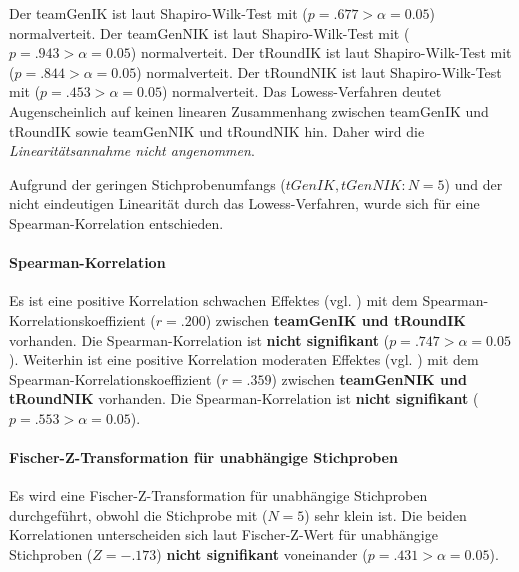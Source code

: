 \documentclass[a4paper,11pt]{article}%
\renewcommand{\\}{\vspace*{0.5\baselineskip} \newline}
\begin{document}
%
Der \ac{teamGenIK} ist laut Shapiro-Wilk-Test mit ($p = .677 > \alpha = 0.05$) normalverteit. \newline
Der \ac{teamGenNIK} ist laut Shapiro-Wilk-Test mit ($p = .943 > \alpha = 0.05$) normalverteit. \newline
Der \ac{tRoundIK} ist laut Shapiro-Wilk-Test mit ($p = .844 > \alpha = 0.05$) normalverteit. \newline
Der \ac{tRoundNIK} ist laut Shapiro-Wilk-Test mit ($p = .453 > \alpha = 0.05$) normalverteit. \\
Das Lowess-Verfahren deutet Augenscheinlich auf keinen linearen Zusammenhang zwischen \ac{teamGenIK} und \ac{tRoundIK} sowie \ac{teamGenNIK} und \ac{tRoundNIK} hin. Daher wird die \textit{Linearitätsannahme nicht angenommen}.

Aufgrund der geringen Stichprobenumfangs ($tGenIK, tGenNIK : N=5$) und der nicht eindeutigen Linearität durch das Lowess-Verfahren, wurde sich für eine Spearman-Korrelation entschieden.

\paragraph{Spearman-Korrelation}
Es ist eine positive Korrelation schwachen Effektes (vgl. \cite{cohen2013statistical}) mit dem Spearman-Korrelationskoeffizient ($r = .200$) zwischen \textbf{\ac{teamGenIK} und \ac{tRoundIK}} vorhanden. Die Spearman-Korrelation ist \textbf{nicht signifikant} ($p = .747 > \alpha = 0.05$).\\
Weiterhin ist eine positive Korrelation moderaten Effektes (vgl. \cite{cohen2013statistical}) mit dem Spearman-Korrelationskoeffizient ($r = .359$) zwischen \textbf{\ac{teamGenNIK} und \ac{tRoundNIK}} vorhanden. Die Spearman-Korrelation ist \textbf{nicht signifikant} ($p = .553 > \alpha = 0.05$).

\paragraph{Fischer-Z-Transformation für unabhängige Stichproben}
Es wird eine Fischer-Z-Transformation für unabhängige Stichproben durchgeführt, obwohl die Stichprobe mit ($N=5$) sehr klein ist.
Die beiden Korrelationen unterscheiden sich laut Fischer-Z-Wert für unabhängige Stichproben ($Z=-.173$) \textbf{nicht signifikant} voneinander ($p = .431 > \alpha = 0.05$).
\end{document}
